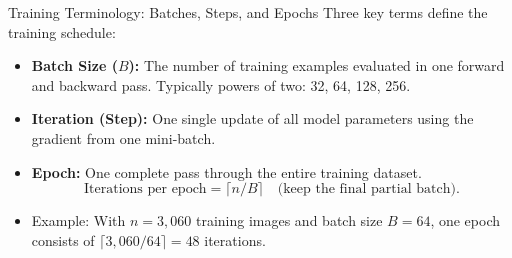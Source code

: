 \begin{frame}{Training Terminology: Batches, Steps, and Epochs}
    Three key terms define the training schedule:
    \begin{itemize}
        \item \textbf{Batch Size ($B$):} The number of training examples evaluated in one forward and backward pass. Typically powers of two: 32, 64, 128, 256.
        \item \textbf{Iteration (Step):} One single update of all model parameters using the gradient from one mini-batch.
        \item \textbf{Epoch:} One complete pass through the entire training dataset.
        \[
            \text{Iterations per epoch} = \lceil n/B \rceil \quad \text{(keep the final partial batch).}
        \]
        \item Example: With $n = 3{,}060$ training images and batch size $B = 64$, one epoch consists of $\lceil 3{,}060 / 64 \rceil = 48$ iterations.
    \end{itemize}
\end{frame}

